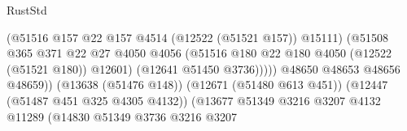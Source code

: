 \begin{lexlean}{RustStd}
\begin{coremodule}
                                                          (@51516
                                                            @157
                                                            @22
                                                            @157
                                                            @4514
                                                            (@12522 (@51521 @157))
                                                            @15111)
                                                          (@51508
                                                            @365
                                                            @371
                                                            @22
                                                            @27
                                                            @4050
                                                            @4056
                                                            (@51516
                                                              @180
                                                              @22
                                                              @180
                                                              @4050
                                                              (@12522 (@51521 @180))
                                                              @12601)
                                                            (@12641 @51450 @3736)))))
                                                    @48650
                                                    @48653
                                                    @48656
                                                    @48659))
                                                (@13638 (@51476 @148))
                                                (@12671 (@51480 @613 @451))
                                                (@12447 (@51487 @451 @325 @4305 @4132))
                                                (@13677
                                                  @51349
                                                  @3216
                                                  @3207
                                                  @4132
                                                  @11289
                                                  (@14830
                                                    @51349
                                                    @3736
                                                    @3216
                                                    @3207

\end{coremodule}
\end{lexlean}
